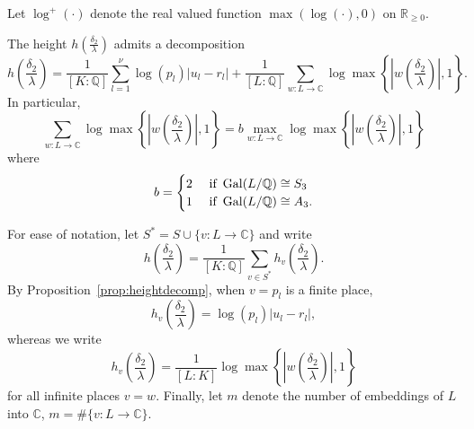 Let $\log^+(\cdot)$ denote the real valued function $\max(\log(\cdot), 0)$ on $\mathbb{R}_{\geq 0}$. 

\begin{proposition}\label{prop:heightdecomp}
The height $h\left(\frac{\delta_2}{\lambda}\right)$ admits a decomposition 
\begin{equation} \label{eq:hdecomp}
h\left(\frac{\delta_2}{\lambda}\right) = \frac{1}{[K:\mathbb{Q}]}\sum_{l = 1}^{\nu} \log(p_l)|u_l - r_l| + \frac{1}{[L:\mathbb{Q}]}\sum_{w :L \to \mathbb{C}} \log \max \left\{ \left|w\left(\frac{\delta_2}{\lambda}\right)\right|, 1\right\}.
\end{equation}
In particular, 
\[\sum_{w :L \to \mathbb{C}} \log \max \left\{ \left|w\left(\frac{\delta_2}{\lambda}\right)\right|, 1\right\} = 
b\max_{w:L\to \mathbb{C}} \log \max \left\{ \left|w\left(\frac{\delta_2}{\lambda}\right)\right|, 1\right\}\]
where
\[b =
\begin{cases}
2 & \text{ if } \operatorname{Gal}(L/\mathbb{Q}) \cong S_3\\
1 & \text{ if } \operatorname{Gal}(L/\mathbb{Q}) \cong A_3.
\end{cases}\]
\end{proposition}
For ease of notation, let $S^* = S \cup \{v : L \to \mathbb{C}\}$ and write 
\[h\left(\frac{\delta_2}{\lambda}\right) = \frac{1}{[K:\mathbb{Q}]}\sum_{v \in S^*}h_{v}\left(\frac{\delta_2}{\lambda}\right).\]
By Proposition~\ref{prop:heightdecomp}, when $v = p_l$ is a finite place, 
\[h_{v}\left(\frac{\delta_2}{\lambda}\right) = \log(p_l)|u_l - r_l|,\]
whereas we write
\[h_{v}\left(\frac{\delta_2}{\lambda}\right) = \frac{1}{[L:K]} \log \max \left\{ \left|w\left(\frac{\delta_2}{\lambda}\right)\right|, 1\right\}\]
for all infinite places $v = w$. Finally, let $m$ denote the number of embeddings of $L$ into $\mathbb{C}$,  $m = \# \{v : L \to \mathbb{C}\}$. 

